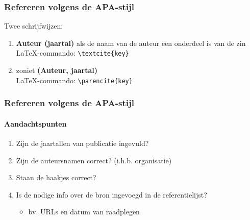 \begin{frame}[fragile]
  \frametitle{Refereren volgens de APA-stijl}
  Twee schrijfwijzen:
  
  \begin{enumerate}
    \item \textbf{Auteur (jaartal)} als de naam van de auteur een onderdeel is van de zin\\
    \LaTeX{}-commando: \verb|\textcite{key}|
    
    
    \item zoniet \textbf{(Auteur, jaartal)}\\
    \LaTeX{}-commando: \verb|\parencite{key}|
    
  \end{enumerate}

\end{frame}

\begin{frame}
  \frametitle{Refereren volgens de APA-stijl}
  
  \framesubtitle{Aandachtspunten}

  \begin{enumerate}
    \item Zijn de jaartallen van publicatie ingevuld?
    \item Zijn de auteursnamen correct? (i.h.b. organisatie)
    \item Staan de haakjes correct?
    \item Is de nodige info over de bron ingevoegd in de referentielijst?
    \begin{itemize}
      \item bv. URLs en datum van raadplegen
    \end{itemize}
  \end{enumerate}

\end{frame}


